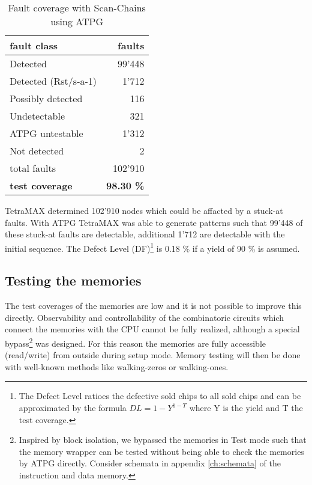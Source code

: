 
\begin{table}[htbp]
 \caption{Fault coverage with Scan-Chains using ATPG}
 \label{tab:fault_coverage}
 \centering\begin{tabular}{|l|r|} \hline
\textbf{fault class} & \textbf{faults} \\ \hline\hline
Detected & 99'448 \\ \hline
Detected (Rst/s-a-1) & 1'712 \\ \hline
Possibly detected & 116 \\ \hline
Undetectable & 321 \\ \hline
ATPG untestable & 1'312 \\ \hline
Not detected & 2 \\ \hline \hline
total faults & 102'910 \\ \hline
\textbf{test coverage} & \textbf{98.30 \%} \\ \hline
 \end{tabular}
\end{table}

TetraMAX determined 102'910 nodes which could be affacted by a stuck-at faults. With ATPG TetraMAX was able to generate patterns such that 99'448 of these stuck-at faults are detectable, additional 1'712 are detectable with the initial sequence. The Defect Level (DF)\footnote{The Defect Level ratioes the defective sold chips to all sold chips and can be approximated by the formula $DL=1-Y^{1-T}$ where Y is the yield and T the test coverage.\cite{vlsi3}} is 0.18 \% if a yield of 90 \% is assumed.

\subsection{Testing the memories}
The test coverages of the memories are low and it is not possible to improve this directly. Observability and controllability of the combinatoric circuits which connect the memories with the CPU cannot be fully realized, although a special bypass\footnote{Inspired by block isolation, we bypassed the memories in Test mode such that the memory wrapper can be tested without being able to check the memories by ATPG directly. Consider schemata in appendix \ref{ch:schemata} of the instruction and data memory.} was designed. For this reason the memories are fully accessible (read/write) from outside during setup mode. Memory testing will then be done with well-known methods like walking-zeros or walking-ones. 



